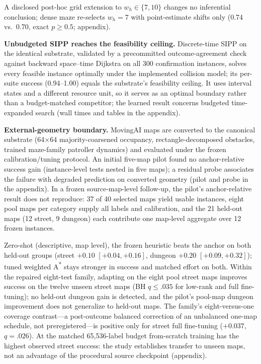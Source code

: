 \documentclass[letterpaper]{article} %
\begin{document}
A disclosed post-hoc grid extension to $w_h \in \{7, 10\}$ changes no inferential conclusion; dense maze re-selects $w_h{=}7$ with point-estimate shifts only (0.74 vs.\ 0.70, exact $p \geq 0.5$; appendix).

\textbf{Unbudgeted SIPP reaches the feasibility ceiling.} Discrete-time SIPP \citep{phillips2011sipp} on the identical substrate, validated by a precommitted outcome-agreement check against backward space--time Dijkstra on all 300 confirmation instances, solves every feasible instance optimally under the implemented collision model; its per-suite success (0.94--1.00) equals the substrate's feasibility ceiling. It uses interval states and a different resource unit, so it serves as an optimal boundary rather than a budget-matched competitor; the learned result concerns budgeted time-expanded search (wall times and tables in the appendix).

\textbf{External-geometry boundary.} MovingAI maps \citep{sturtevant2012movingai} are converted to the canonical substrate (64$\times$64 majority-coarsened occupancy, rectangle-decomposed obstacles, trained maze-family patroller dynamics) and evaluated under the frozen calibration/tuning protocol. An initial five-map pilot found no anchor-relative success gain (instance-level tests nested in five maps); a residual probe associates the failure with degraded prediction on converted geometry (pilot and probe in the appendix). In a frozen source-map-level follow-up, the pilot's anchor-relative result does not reproduce: 37 of 40 selected maps yield usable instances, eight pool maps per category supply all labels and calibration, and the 21 held-out maps (12 street, 9 dungeon) each contribute one map-level aggregate over 12 frozen instances.

Zero-shot (descriptive, map level), the frozen heuristic beats the anchor on both held-out groups (street $+0.10$ $[+0.04,+0.16]$, dungeon $+0.20$ $[+0.09,+0.32]$); tuned weighted A\textsuperscript{*} stays stronger in success and matched effort on both. Within the repaired eight-test family, adapting on the eight pool street maps improves success on the twelve unseen street maps (BH $q \leq .035$ for low-rank and full fine-tuning); no held-out dungeon gain is detected, and the pilot's pool-map dungeon improvement does not generalize to held-out maps. The family's eight-versus-one coverage contrast---a post-outcome balanced correction of an unbalanced one-map schedule, not preregistered---is positive only for street full fine-tuning ($+0.037$, $q{=}.026$). At the matched 65{,}536-label budget from-scratch training has the highest observed street success: the study establishes transfer to unseen maps, not an advantage of the procedural source checkpoint (appendix).
\end{document}
